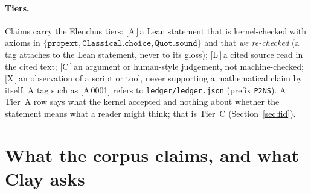 \documentclass[10pt]{article}
\newcommand{\tg}[2]{\texorpdfstring{\textsf{[#1\,#2]}}{}}  %
\newcommand{\lean}[1]{\texttt{#1}}
\renewcommand{\_}{\textunderscore\allowbreak}
\begin{document}
\begin{abstract}
Clay errata, which adds a periodic-pressure condition that makes the Lean nonexistence claim weaker than a main-text-only reading \tg{C}{0002}\tg{C}{0003};
it agrees with H9 on every row \tg{X}{0010}. \textbf{Not established:} Comparator, \texttt{lean4export} and \texttt{nanoda} were not run; Mathlib is trusted,
not re-checked; the diff of the challenge file against \texttt{formal-conjectures@8bf45ed} is open; the proof's mathematics was not refereed by people; the Lean kernel
and toolchain are trusted; statement fidelity is a human judgement, made here by AI agents \tg{C}{0007}. Conditionally on fidelity and on the soundness of Lean and
Mathlib, the formal object proves Fefferman's alternative~(C); that is not a Clay determination \tg{C}{0005}.
\textbf{Scope (clarified in v1.2).} The Navier--Stokes theorems audited are the forced breakdown alternative~(C) and, with the errata's periodic-pressure
condition, (D); they do not address the unforced alternatives (A) or (B). Statement identity is checked against the corpus's own challenge file and
statement fidelity is judged against Fefferman's text; neither is compared with OpenAI's natural-language papers, and we make no claim that the Lean
statements or the Lean development match those papers. A preprint that compares the development with the Navier--Stokes paper at the commit audited here~\cite{bch}
reports lemma-level mismatches (for example Lean estimates requiring $m+5$ input derivatives where the paper uses $m+4$) and does not examine the top-level statements \tg{C}{0007}.
\end{abstract}

\paragraph{Tiers.} Claims carry the Elenchus tiers: \tg{A}{}\,a Lean statement that is kernel-checked with axioms in
$\{\lean{propext},\lean{Classical.choice},\lean{Quot.sound}\}$ and that \emph{we re-checked} (a tag attaches to the Lean statement, never to its gloss);
\tg{L}{}\,a cited source read in the cited text; \tg{C}{}\,an argument or human-style judgement, not machine-checked; \tg{X}{}\,an observation of a script or tool,
never supporting a mathematical claim by itself. A tag such as \tg{A}{0001} refers to \texttt{ledger/ledger.json} (prefix \texttt{P2NS}). A Tier~A row says what the kernel accepted and
nothing about whether the statement means what a reader might think; that is Tier~C (Section~\ref{sec:fid}).

\section{What the corpus claims, and what Clay asks}\label{sec:claims}
\end{document}
